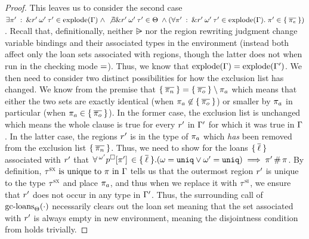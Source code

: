 \begin{proof}
  This leaves us to consider the second case
  $\exists \pi^\prime \: : \: \& r^\prime \: \omega^\prime \: \tau^\prime \in \textrm{explode}(\Gamma) \; \wedge \; \not \exists
  \& r^\prime \: \omega^\prime \: \tau^\prime \in \Theta \;
  \wedge
  (\forall \pi^\prime \: : \: \& r^\prime \: \omega^\prime \: \tau^\prime \in \textrm{explode}(\Gamma). \;
  \pi^\prime \in \{ \: 
    \overline{\pi_e}
   \: \})$. Recall that, definitionally, neither $\rsub$ nor the region
  rewriting judgment change variable bindings and their associated types in the
  environment (instead both affect only the loan sets associated with regions,
  though the latter does not when run in the checking mode $=$).
  Thus, we know that $\textrm{explode}(\Gamma) = \textrm{explode}(\Gamma^\prime)$. We then
  need to consider two distinct possibilities for how the exclusion list has
  changed. We know from the premise that $\{ \: \overline{\pi_n} \: \} =
  \{ \: \overline{\pi_o} \: \} \setminus \pi_a$ which means that either the two sets
  are exactly identical (when $\pi_a \not\in \{ \: \overline{\pi_o} \: \}$) or
  smaller by $\pi_a$ in particular
  (when $\pi_a \in \{ \: \overline{\pi_o} \: \}$). In the former case, the
  exclusion list is unchanged which means the whole clause is true for every
  $r^\prime$ in $\Gamma^\prime$ for which it was true in $\Gamma$. In the
  latter case, the regions $r^\prime$ is in the type of $\pi_a$ which
  \emph{has} been removed from the exclusion list $\{ \: \overline{\pi_n} \: \}$.
  Thus, we need to show for the loans $\{ \: \overline{\ell} \: \}$ associated
  with $r^\prime$ that $\forall \,^{\omega^\prime}p^\square[\pi^\prime]\,
  \in \{ \: \overline{\ell} \: \}. (\omega = \mathtt{uniq} \vee \omega^\prime = \mathtt{uniq})
  \implies \pi^\prime \, \# \, \pi$. By definition,
  $\tau^\textsc{sx} \textrm{ is unique to } \pi \textrm{ in } \Gamma$ tells us that the outermost
  region $r^\prime$ is unique to the type $\tau^\textsc{sx}$ and place $\pi_a$,
  and thus when we replace it with $\tau^\textsc{si}$, we ensure that $r^\prime$ does
  not occur in any type in $\Gamma^\prime$. Thus, the surrounding call of
  $\textrm{gc-loans}_{\Theta}(\cdot)$ necessarily clears out the loan set meaning that
  the set associated with $r^\prime$ is always empty in new environment,
  meaning the disjointness condition from  holds trivially.

  \vspace{1em}
  \noindent \framebox[\textwidth]{ \figuresize
    \begin{mathpar}
      \ODeref
    \end{mathpar}
  } \vspace{1em}


\end{proof}
